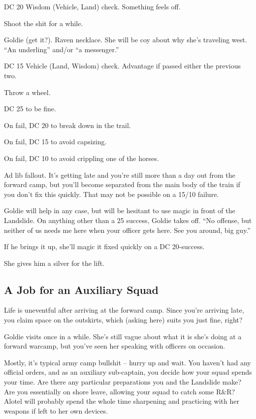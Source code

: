\begin{multicols}{2}
DC 20 Wisdom (Vehicle, Land) check.
Something feels off.

Shoot the shit for a while.

Goldie (get it?).
Raven necklace.
She will be coy about why she's traveling west.
``An underling'' and/or ``a messenger.''

DC 15 Vehicle (Land, Wisdom) check.
Advantage if passed either the previous two.

Throw a wheel.

DC 25 to be fine.

On fail, DC 20 to break down in the trail.

On fail, DC 15 to avoid capsizing.

On fail, DC 10 to avoid crippling one of the horses.

Ad lib fallout.
It's getting late and you're still more than a day out from the forward camp, but you'll become
  separated from the main body of the train if you don't fix this quickly.
That may not be possible on a 15/10 failure.

Goldie will help in any case, but will be hesitant to use magic in front of the Landslide.
On anything other than a 25 success, Goldie takes off.
``No offense, but neither of us needs me here when your officer gets here.
See you around, big guy.''

If he brings it up, she'll magic it fixed quickly on a DC 20-success.

She gives him a silver for the lift.

\subsection{A Job for an Auxiliary Squad}

Life is uneventful after arriving at the forward camp.
Since you're arriving late, you claim space on the outskirts,
  which (asking here) suits you just fine, right?

Goldie visits once in a while.
She's still vague about what it is she's doing at a forward warcamp,
  but you've seen her speaking with officers on occasion.

Mostly, it's typical army camp bullshit -- hurry up and wait.
You haven't had any official orders, and as an auxiliary sub-captain, you decide how your squad
  spends your time.
Are there any particular preparations you and the Landslide make?
Are you essentially on shore leave, allowing your squad to catch some R\&R?
Alotel will probably spend the whole time sharpening and practicing with her weapons if left to
  her own devices.


\end{multicols}
